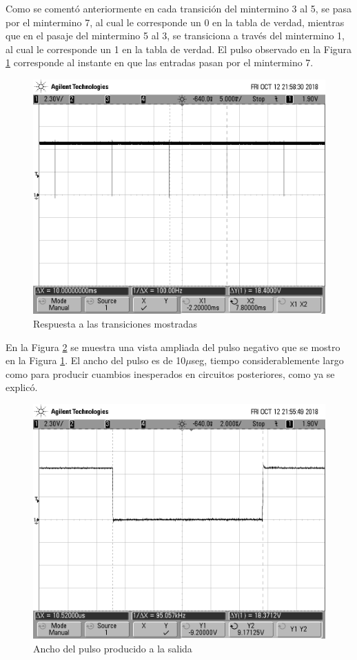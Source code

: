 

Como se comentó anteriormente en cada transición del mintermino 3 al 5, se pasa por el mintermino 7, al cual le corresponde un 0 en la tabla de verdad, mientras que en el pasaje del mintermino 5 al 3, se transiciona a través del mintermino 1, al cual le corresponde un 1 en la tabla de verdad. El pulso observado en la Figura \ref{3_fig2} corresponde al instante en que las entradas pasan por el mintermino 7.


\begin{figure}[H]
\begin{center}
\includegraphics[scale=0.3]{ejercicio3/imagenes/riple.png}
\caption{Respuesta a las transiciones mostradas} \label{3_fig2}
\end{center}
\end{figure}

En la Figura \ref{3_fig3} se muestra una vista ampliada del pulso negativo que se mostro en la Figura \ref{3_fig2}. El ancho del pulso es de 10$\mu$seg, tiempo considerablemente largo como para producir cuambios inesperados en circuitos posteriores, como ya se explicó.

\begin{figure}[H]
\begin{center}
\includegraphics[scale=0.3]{ejercicio3/imagenes/tdown.png}
\caption{Ancho del pulso producido a la salida} \label{3_fig3}
\end{center}
\end{figure}
